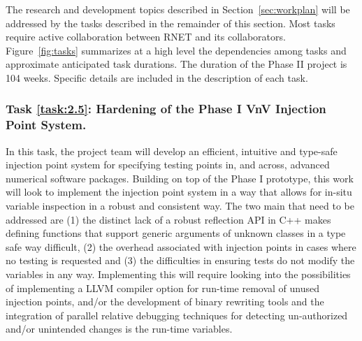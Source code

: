 The research and development topics described in Section~\ref{sec:workplan} 
will be addressed by the tasks described in the remainder of this section. Most 
tasks require active collaboration between RNET and its collaborators. 
Figure~\ref{fig:tasks} summarizes at a high level the dependencies among tasks  and
approximate anticipated task durations. The duration of the Phase II 
project is 104 weeks. Specific details are included in the description of each 
task.


\setcounter{taskCount}{0}

\label{task:2.5}
\subsubsection{Task \ref{task:2.5}: Hardening of the Phase I VnV Injection Point System. }

In this task, the project team will develop an efficient, intuitive and type-safe injection point system for specifying testing points in, and across, advanced numerical software packages. Building on top of the Phase I prototype, this work will look to implement the injection point system in a way that allows for in-situ variable inspection in a robust and consistent way. The two main that need to be addressed are (1) the distinct lack of a robust reflection API in C++ makes defining functions that support generic arguments of unknown classes in a type safe way difficult, (2) the overhead associated with \VV injection points in cases where no testing is requested and (3) the difficulties in ensuring tests do not modify the variables in any way. Implementing this will require looking into the possibilities of implementing a LLVM compiler option for run-time removal of unused injection points, and/or the development of binary rewriting tools and the integration of parallel relative debugging techniques for detecting un-authorized and/or unintended changes is the run-time variables. 



\label{task:3}
